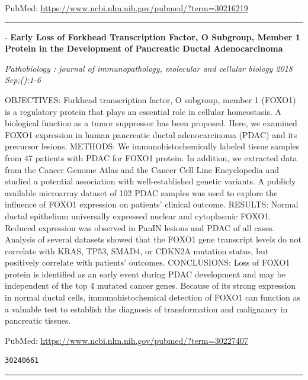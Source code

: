 \documentclass[]{article}
\begin{document}
PubMed: \url{https://www.ncbi.nlm.nih.gov/pubmed/?term=30216219}

{}

{}

\begin{center}\rule{0.5\linewidth}{\linethickness}\end{center}

 - \textbf{Early Loss of Forkhead Transcription Factor, O Subgroup,
Member 1 Protein in the Development of Pancreatic Ductal Adenocarcinoma}

\emph{Pathobiology : journal of immunopathology, molecular and cellular
biology 2018 Sep;():1-6}

OBJECTIVES: Forkhead transcription factor, O subgroup, member 1 (FOXO1)
is a regulatory protein that plays an essential role in cellular
homeostasis. A biological function as a tumor suppressor has been
proposed. Here, we examined FOXO1 expression in human pancreatic ductal
adenocarcinoma (PDAC) and its precursor lesions. METHODS: We
immunohistochemically labeled tissue samples from 47 patients with PDAC
for FOXO1 protein. In addition, we extracted data from the Cancer Genome
Atlas and the Cancer Cell Line Encyclopedia and studied a potential
association with well-established genetic variants. A publicly available
microarray dataset of 102 PDAC samples was used to explore the influence
of FOXO1 expression on patients' clinical outcome. RESULTS: Normal
ductal epithelium universally expressed nuclear and cytoplasmic FOXO1.
Reduced expression was observed in PanIN lesions and PDAC of all cases.
Analysis of several datasets showed that the FOXO1 gene transcript
levels do not correlate with KRAS, TP53, SMAD4, or CDKN2A mutation
status, but positively correlate with patients' outcomes. CONCLUSIONS:
Loss of FOXO1 protein is identified as an early event during PDAC
development and may be independent of the top 4 mutated cancer genes.
Because of its strong expression in normal ductal cells,
immunohistochemical detection of FOXO1 can function as a valuable test
to establish the diagnosis of transformation and malignancy in
pancreatic tissues.

PubMed: \url{https://www.ncbi.nlm.nih.gov/pubmed/?term=30227407}

{}

{}

\begin{verbatim}
30240661
\end{verbatim}

\begin{center}\rule{0.5\linewidth}{\linethickness}\end{center}
\end{document}
